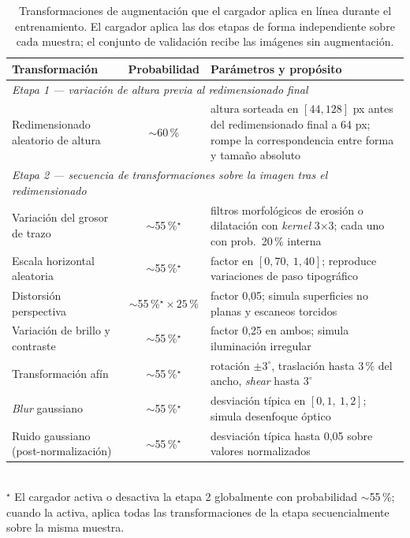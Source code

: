 \begin{table}[!htbp]
	\centering
	\caption{Transformaciones de augmentación que el cargador aplica en línea durante el entrenamiento. El cargador aplica las dos etapas de forma independiente sobre cada muestra; el conjunto de validación recibe las imágenes sin augmentación.}
	\label{tab:augmentacion}
	\begin{tabular}{p{4.2cm}cp{6.0cm}}
		\toprule
		\textbf{Transformación} & \textbf{Probabilidad} & \textbf{Parámetros y propósito} \\
		\midrule
		\multicolumn{3}{l}{\textit{Etapa 1 --- variación de altura previa al redimensionado final}} \\
		\midrule
		Redimensionado aleatorio de altura & $\sim$60\,\% & altura sorteada en $[44, 128]$ px antes del redimensionado final a 64 px; rompe la correspondencia entre forma y tamaño absoluto \\
		\midrule
		\multicolumn{3}{l}{\textit{Etapa 2 --- secuencia de transformaciones sobre la imagen tras el redimensionado}} \\
		\midrule
		Variación del grosor de trazo & $\sim$55\,\%$^\star$ & filtros morfológicos de erosión o dilatación con \textit{kernel} 3$\times$3; cada uno con prob.\ 20\,\% interna \\
		\addlinespace
		Escala horizontal aleatoria & $\sim$55\,\%$^\star$ & factor en $[0{,}70,\ 1{,}40]$; reproduce variaciones de paso tipográfico \\
		\addlinespace
		Distorsión perspectiva & $\sim$55\,\%$^{\star}\!\!\times\!25\,$\% & factor 0,05; simula superficies no planas y escaneos torcidos \\
		\addlinespace
		Variación de brillo y contraste & $\sim$55\,\%$^\star$ & factor 0,25 en ambos; simula iluminación irregular \\
		\addlinespace
		Transformación afín & $\sim$55\,\%$^\star$ & rotación $\pm 3^\circ$, traslación hasta 3\,\% del ancho, \textit{shear} hasta $3^\circ$ \\
		\addlinespace
		\textit{Blur} gaussiano & $\sim$55\,\%$^\star$ & desviación típica en $[0{,}1,\ 1{,}2]$; simula desenfoque óptico \\
		\addlinespace
		Ruido gaussiano (post-normalización) & $\sim$55\,\%$^\star$ & desviación típica hasta 0,05 sobre valores normalizados \\
		\bottomrule
	\end{tabular}
	\vspace{4pt}\\
	\footnotesize $^\star$ El cargador activa o desactiva la etapa 2 globalmente con probabilidad $\sim$55\,\%; cuando la activa, aplica todas las transformaciones de la etapa secuencialmente sobre la misma muestra.
\end{table}


